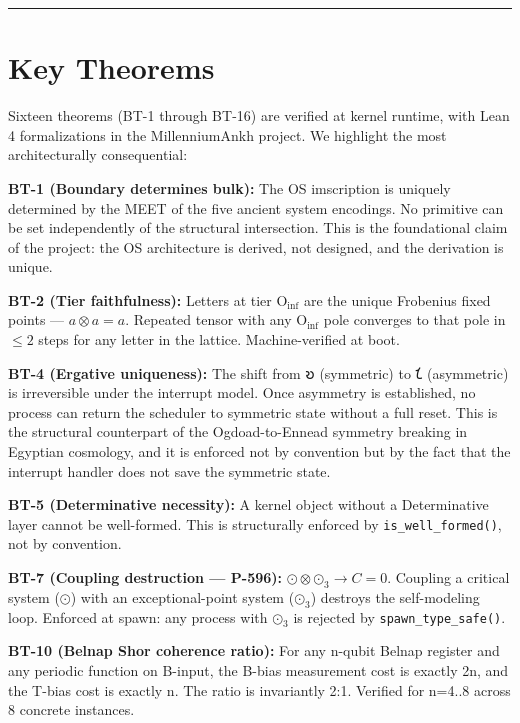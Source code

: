 \documentclass[12pt,a4paper]{article}
\begin{document}
\begin{center}
\rule{0.5\textwidth}{0.4pt}
\end{center}

\section{Key Theorems}

Sixteen theorems (BT-1 through BT-16) are verified at kernel runtime, with Lean 4 formalizations in the MillenniumAnkh project. We highlight the most architecturally consequential:

\textbf{BT-1 (Boundary determines bulk):} The OS imscription is uniquely determined by the MEET of the five ancient system encodings. No primitive can be set independently of the structural intersection. This is the foundational claim of the project: the OS architecture is derived, not designed, and the derivation is unique.

\textbf{BT-2 (Tier faithfulness):} Letters at tier $\text{O}_\text{inf}$ are the unique Frobenius fixed points --- $a \otimes a = a$. Repeated tensor with any $\text{O}_\text{inf}$ pole converges to that pole in $\leq 2$ steps for any letter in the lattice. Machine-verified at boot.

\textbf{BT-4 (Ergative uniqueness):} The shift from $\text{𐑹}$ (symmetric) to $\text{𐑗}$ (asymmetric) is irreversible under the interrupt model. Once asymmetry is established, no process can return the scheduler to symmetric state without a full reset. This is the structural counterpart of the Ogdoad-to-Ennead symmetry breaking in Egyptian cosmology, and it is enforced not by convention but by the fact that the interrupt handler does not save the symmetric state.

\textbf{BT-5 (Determinative necessity):} A kernel object without a Determinative layer cannot be well-formed. This is structurally enforced by \texttt{is\_well\_formed()}, not by convention.

\textbf{BT-7 (Coupling destruction --- P-596):} $\text{⊙} \otimes \text{⊙}_3 \to C = 0$. Coupling a critical system ($\text{⊙}$) with an exceptional-point system ($\text{⊙}_3$) destroys the self-modeling loop. Enforced at spawn: any process with $\text{⊙}_3$ is rejected by \texttt{spawn\_type\_safe()}.

\textbf{BT-10 (Belnap Shor coherence ratio):} For any n-qubit Belnap register and any periodic function on B-input, the B-bias measurement cost is exactly 2n, and the T-bias cost is exactly n. The ratio is invariantly 2:1. Verified for n=4..8 across 8 concrete instances.
\end{document}
